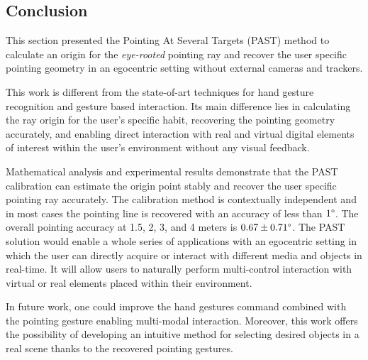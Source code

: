 \subsection{Conclusion}
This section presented the Pointing At Several Targets (PAST) method to calculate an origin for the \textit{eye-rooted} pointing ray and recover the user specific pointing geometry in an egocentric setting without external cameras and trackers. 

This work is different from the state-of-art techniques for hand gesture recognition and gesture based interaction. Its main difference lies in calculating the ray origin for the user's specific habit, recovering the pointing geometry accurately, and enabling direct interaction with real and virtual digital elements of interest within the user's environment without any visual feedback.

Mathematical analysis and experimental results demonstrate that the PAST calibration can estimate the origin point stably and recover the user specific pointing ray accurately. The calibration method is contextually independent and in most cases the pointing line is recovered with an accuracy of less than $1\degree$. The overall pointing accuracy at 1.5, 2, 3, and 4 meters is $0.67\pm0.71\degree$. 
The PAST solution would enable a whole series of applications with an egocentric setting in which the user can directly acquire or interact with different media and objects in real-time. 
It will allow users to naturally perform multi-control interaction with virtual or real elements placed within their environment. 

In future work, one could improve the hand gestures command combined with the pointing gesture enabling multi-modal interaction. Moreover, this work offers the possibility of developing an intuitive method for selecting desired objects in a real scene thanks to the recovered pointing gestures.